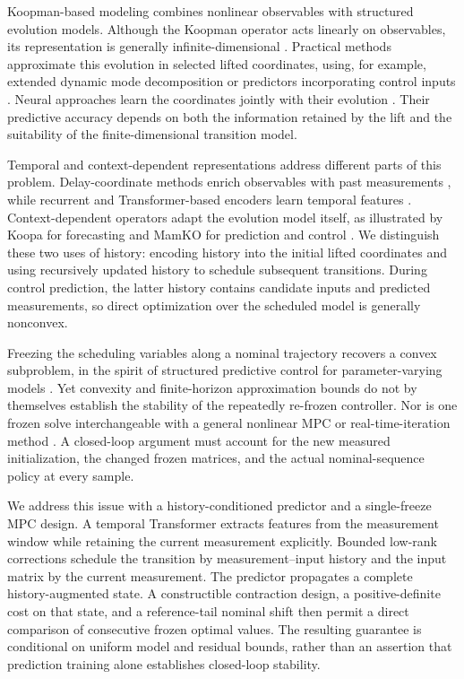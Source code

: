 \documentclass[journal]{IEEEtran}
\begin{document}
Koopman-based modeling combines nonlinear observables with structured evolution models. Although the Koopman operator acts linearly on observables, its representation is generally infinite-dimensional \cite{koopman1931hamiltonian,mezic2005spectral,brunton2022modern}. Practical methods approximate this evolution in selected lifted coordinates, using, for example, extended dynamic mode decomposition or predictors incorporating control inputs \cite{williams2015data,proctor2016dmdc,korda2018linear}. Neural approaches learn the coordinates jointly with their evolution \cite{takeishi2017koopman,lusch2018deep,otto2019linearly,han2020deep}. Their predictive accuracy depends on both the information retained by the lift and the suitability of the finite-dimensional transition model.

Temporal and context-dependent representations address different parts of this problem. Delay-coordinate methods enrich observables with past measurements \cite{kamb2020timedelay,das2019delay}, while recurrent and Transformer-based encoders learn temporal features \cite{han2024robust,shenoy2025temporal,forootani2026deepkoopformer}. Context-dependent operators adapt the evolution model itself, as illustrated by Koopa for forecasting and MamKO for prediction and control \cite{liu2023koopa,li2025mamko}. We distinguish these two uses of history: encoding history into the initial lifted coordinates and using recursively updated history to schedule subsequent transitions. During control prediction, the latter history contains candidate inputs and predicted measurements, so direct optimization over the scheduled model is generally nonconvex.

Freezing the scheduling variables along a nominal trajectory recovers a convex subproblem, in the spirit of structured predictive control for parameter-varying models \cite{cisneros2016qlmpc,cisneros2020qlpv}. Yet convexity and finite-horizon approximation bounds do not by themselves establish the stability of the repeatedly re-frozen controller. Nor is one frozen solve interchangeable with a general nonlinear MPC or real-time-iteration method \cite{diehl2005realtime,gros2020rti}. A closed-loop argument must account for the new measured initialization, the changed frozen matrices, and the actual nominal-sequence policy at every sample.

We address this issue with a history-conditioned predictor and a single-freeze MPC design. A temporal Transformer extracts features from the measurement window while retaining the current measurement explicitly. Bounded low-rank corrections schedule the transition by measurement--input history and the input matrix by the current measurement. The predictor propagates a complete history-augmented state. A constructible contraction design, a positive-definite cost on that state, and a reference-tail nominal shift then permit a direct comparison of consecutive frozen optimal values. The resulting guarantee is conditional on uniform model and residual bounds, rather than an assertion that prediction training alone establishes closed-loop stability.
\end{document}
